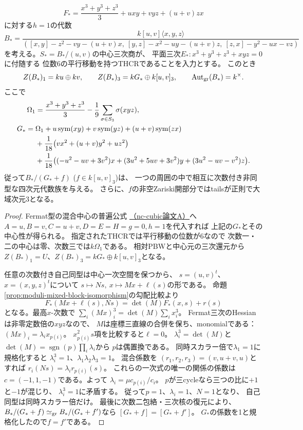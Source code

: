\begin{proposition}
\label{prop:moduli-rigid-example}
\[
 F_*=\frac{x^3+y^3+z^3}{3}
     +uxy+vyz+(u+v)zx
\]
に対する$h=1$の代数
\[
 B_*=\frac{k[u,v]\langle x,y,z\rangle}
 {([x,y]-z^2-vy-(u+v)x,\
   [y,z]-x^2-uy-(u+v)z,\
   [z,x]-y^2-ux-vz)}
\]
を考える。$S_*=B_* /(u,v)$の中心三次商が、
平面三次$E_*:x^3+y^3+z^3+xyz=0$に付随する
位数6の平行移動を持つTHCRであることを入力とする。
このとき
\[
 Z(B_*)_1=ku\oplus kv,\qquad
 Z(B_*)_3=kG_*\oplus k[u,v]_3,
 \qquad \operatorname{Aut}_{\operatorname{gr}}(B_*)=k^\times.
\]
ここで
\[
\begin{aligned}
 \Omega_1&=\frac{x^3+y^3+z^3}{3}
       -\frac19\sum_{\sigma\in S_3}\sigma(xyz),\\
 G_*={}&\Omega_1+
       u\operatorname{sym}(xy)+v\operatorname{sym}(yz)+(u+v)\operatorname{sym}(zx)\\
 &+\frac1{18}\bigl(vx^2+(u+v)y^2+uz^2\bigr)\\
 &+\frac1{18}\bigl((-u^2-uv+3v^2)x
       +(3u^2+5uv+3v^2)y+(3u^2-uv-v^2)z\bigr).
\end{aligned}
\]
従って$B_*/(G_*+f)$ ($f\in k[u,v]_3$)は、
一つの周囲の中で相互に次数付き非同型な四次元代数族を与える。
さらに、$f$の非空Zariski開部分ではtailsが正則で大域次元3となる。
\end{proposition}
\begin{proof}
Fermat型の混合中心の普遍公式
\href{https://github.com/uedakazushi/nc-cubic/blob/main/papers/support/papers/sections/fermat_mixed_universal_center.tex}
{（nc-cubic論文A）}へ
$A=u,B=v,C=u+v,D=E=H=g=0,h=1$を代入すれば
上記の$G_*$とその中心性が得られる。
指定されたTHCRでは平行移動の位数が6なので
次数一・二の中心は零、次数三では$k\Omega_1$である。
相対PBWと中心元の三次還元から
$Z(B_*)_1=U$、$Z(B_*)_3=kG_*\oplus k[u,v]_3$となる。

任意の次数付き自己同型は中心一次空間を保つから、
$s=(u,v)^t$、$x=(x,y,z)^t$について
$s\mapsto Ns,\ x\mapsto Mx+\ell(s)$の形である。
命題\ref{prop:moduli-mixed-block-isomorphism}の勾配比較より
\[
 F_*(Mx+\ell(s),Ns)=\det(M)F_*(x,s)+r(s)
\]
となる。最高$x$-次数で
$\sum_i(Mx)_i^3=\det(M)\sum_ix_i^3$。
Fermat三次のHessianは非零定数倍の$xyz$なので、
$M$は座標三直線の合併を保ち、monomialである：
$(Mx)_i=\lambda_i x_{p(i)}$。
$x_{p(i)}^2s$項を比較すると$\ell=0$。
$\lambda_i^3=\det(M)$と
$\det(M)=\operatorname{sgn}(p)\prod_i\lambda_i$から
$p$は偶置換である。
同時スカラー倍で$\lambda_1=1$に規格化すると
$\lambda_i^3=1$、$\lambda_1\lambda_2\lambda_3=1$。
混合係数を
$(r_1,r_2,r_3)=(v,u+v,u)$とすれば
$r_i(Ns)=\lambda_i r_{p(i)}(s)$。
これらの一次式の唯一の関係の係数は
$c=(-1,1,-1)$である。よって
$\lambda_i=\mu c_{p(i)}/c_i$。
$p$が三cycleなら三つの比に$+1$と$-1$が混じり、
$\lambda_i^3=1$に矛盾する。
従って$p=1$、$\lambda_i=1$、$N=1$となり、
自己同型は同時スカラー倍だけ。
最後に次数二包絡・三次核の復元により、
$B_*/(G_*+f)\simeq_{\operatorname{gr}}B_*/(G_*+f')$なら
$[G_*+f]=[G_*+f']$。
$G_*$の係数を1と規格化したので$f=f'$である。
\end{proof}

